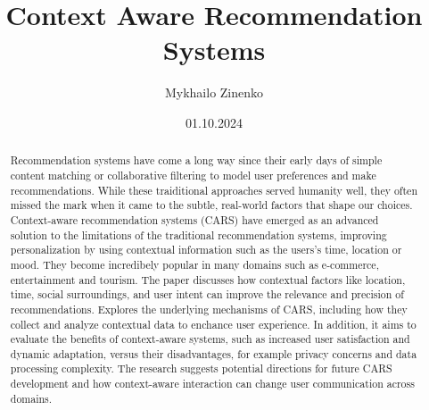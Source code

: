 \documentclass[11pt]{article} %
\title{Context Aware Recommendation Systems}
\author{Mykhailo Zinenko}
\date{01.10.2024} %
\begin{document}
\maketitle

\begin{abstract}
Recommendation systems have come a long way since their early days of simple content matching or collaborative filtering to model user preferences and make recommendations. While these traiditional approaches served humanity well, they often missed the mark when it came to the subtle, real-world factors that shape our choices. Context-aware recommendation systems (CARS) have emerged as an advanced solution to the limitations of the traditional recommendation systems, improving personalization by using contextual information such as the users's time, location or mood. They become incredibely popular in many domains such as e-commerce, entertainment and tourism. The paper discusses how contextual factors like location, time, social surroundings, and user intent can improve the relevance and precision of recommendations. Explores the underlying mechanisms of CARS, including how they collect and analyze contextual data to enchance user experience. In addition, it aims to evaluate the benefits of context-aware systems, such as increased user satisfaction and dynamic adaptation, versus their disadvantages, for example privacy concerns and data processing complexity. The research suggests potential directions for future CARS development and how context-aware interaction can change user communication across domains.
\end{abstract}



\end{document}
